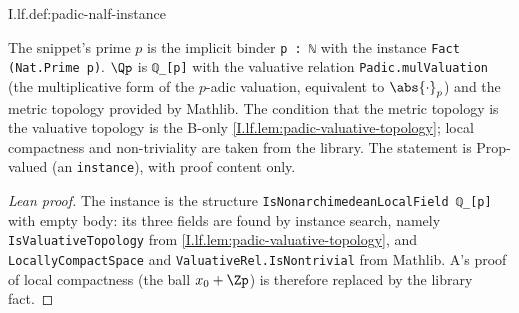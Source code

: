 \begin{definition}
\end{definition}
\begin{tfformal}{I.lf.def:padic-nalf-instance}
\begin{tffidelity}
The snippet's prime $p$ is the implicit binder \texttt{p : ℕ} with the instance \texttt{Fact (Nat.Prime p)}. $\Qp$ is \texttt{ℚ\_[p]} with the valuative relation \texttt{Padic.mulValuation} (the multiplicative form of the $p$-adic valuation, equivalent to $\abs{\cdot}_p$) and the metric topology provided by Mathlib. The condition that the metric topology is the valuative topology is the B-only \cref{I.lf.lem:padic-valuative-topology}; local compactness and non-triviality are taken from the library. The statement is Prop-valued (an \texttt{instance}), with proof content only.
\end{tffidelity}
\end{tfformal}
\begin{proof}[Lean proof]
The instance is the structure \texttt{IsNonarchimedeanLocalField ℚ\_[p]} with empty body: its three fields are found by instance search, namely \texttt{IsValuativeTopology} from \cref{I.lf.lem:padic-valuative-topology}, and \texttt{LocallyCompactSpace} and \texttt{ValuativeRel.IsNontrivial} from Mathlib. A's proof of local compactness (the ball $x_0+\Zp$) is therefore replaced by the library fact.
\end{proof}

